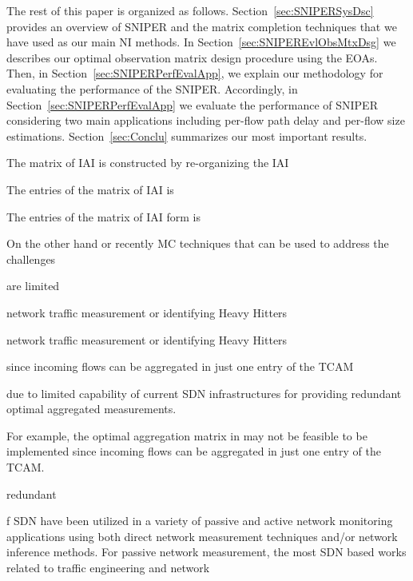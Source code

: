 The rest of this paper is organized as follows. Section~\ref{sec:SNIPERSysDsc} provides an overview of SNIPER and
the matrix completion techniques that we have used as our main NI methods.  In Section~\ref{sec:SNIPEREvlObsMtxDsg} we describes our
optimal observation matrix design procedure using the EOAs. Then, in Section~\ref{sec:SNIPERPerfEvalApp}, we explain our methodology for evaluating the performance of the SNIPER. Accordingly, in Section~\ref{sec:SNIPERPerfEvalApp} we evaluate the performance of SNIPER considering two main applications including per-flow path delay and per-flow size estimations. Section~\ref{sec:Conclu} summarizes our most important results. 





 

The matrix of IAI is constructed by re-organizing the IAI 

The entries of the matrix of IAI is 

The entries of the matrix of IAI form is 



On the other hand or recently MC techniques
that can be used to address the challenges 



are limited 

network traffic measurement or identifying Heavy Hitters

network traffic measurement or identifying Heavy Hitters


 since incoming flows can be aggregated in just one entry of the TCAM

 due to limited capability of current SDN infrastructures for providing redundant optimal aggregated measurements.  


For example, the optimal aggregation matrix in \cite{IF14iSTAMP:2014} may not be feasible to be implemented since incoming flows can be aggregated in just one entry of the TCAM.  

redundant


f SDN have been utilized in a variety of passive and active network monitoring applications using both direct network measurement techniques and/or network inference methods. For passive network measurement, the most SDN based works related to traffic engineering and network 



